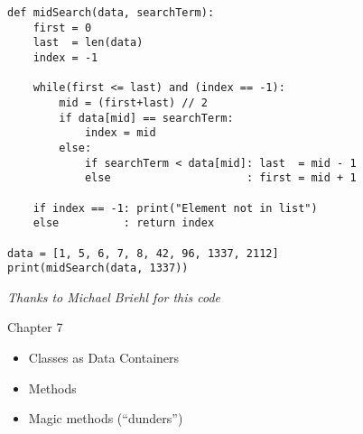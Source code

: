 \begin{frame}[fragile]
%
\begin{codebox}
\begin{verbatim}
def midSearch(data, searchTerm):
    first = 0
    last  = len(data)
    index = -1
    
    while(first <= last) and (index == -1):
        mid = (first+last) // 2
        if data[mid] == searchTerm:
            index = mid
        else:
            if searchTerm < data[mid]: last  = mid - 1
            else                     : first = mid + 1

    if index == -1: print("Element not in list")
    else          : return index

data = [1, 5, 6, 7, 8, 42, 96, 1337, 2112]
print(midSearch(data, 1337))
\end{verbatim}
\end{codebox}
%
\begin{flushright}
\scriptsize \emph{Thanks to Michael Briehl for this code}
\end{flushright}
%
\end{frame}


\begin{frame}[fragile]{Chapter 7}
%
\begin{itemize}
\item Classes as Data Containers
\item Methods
\item Magic methods (\enquote{dunders})
\end{itemize}
%
\end{frame}


